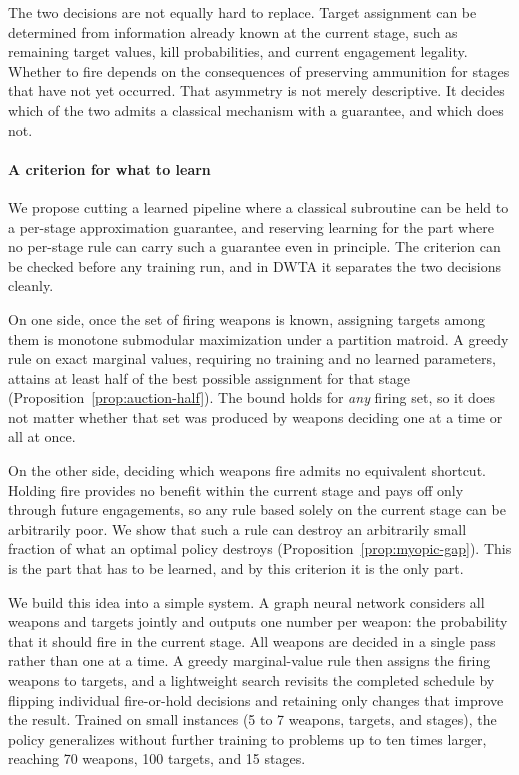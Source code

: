 The two decisions are not equally hard to replace. Target assignment can be
determined from information already known at the current stage, such as
remaining target values, kill probabilities, and current engagement legality.
Whether to fire depends on the consequences of preserving ammunition for
stages that have not yet occurred. That asymmetry is not merely descriptive.
It decides which of the two admits a classical mechanism with a guarantee,
and which does not.

\paragraph{A criterion for what to learn} We propose cutting a learned
pipeline where a classical subroutine can be held to a per-stage approximation
guarantee, and reserving learning for the part where no per-stage rule can
carry such a guarantee even in principle. The criterion can be checked before
any training run, and in DWTA it separates the two decisions cleanly.

On one side, once the set of firing weapons is known, assigning targets among
them is monotone submodular maximization under a partition matroid. A greedy
rule on exact marginal values, requiring no training and no learned
parameters, attains at least half of the best possible assignment for that
stage (Proposition~\ref{prop:auction-half}). The bound holds for \emph{any}
firing set, so it does not matter whether that set was produced by weapons
deciding one at a time or all at once.

On the other side, deciding which weapons fire admits no equivalent shortcut.
Holding fire provides no benefit within the current stage and pays off only
through future engagements, so any rule based solely on the current stage can
be arbitrarily poor. We show that such a rule can destroy an arbitrarily small
fraction of what an optimal policy destroys
(Proposition~\ref{prop:myopic-gap}). This is the part that has to be learned,
and by this criterion it is the only part.

We build this idea into a simple system. A graph neural network considers all
weapons and targets jointly and outputs one number per weapon: the
probability that it should fire in the current stage. All weapons are
decided in a single pass rather than one at a time. A greedy marginal-value
rule then assigns the firing weapons to targets, and a lightweight search
revisits the completed schedule by flipping individual fire-or-hold decisions
and retaining only changes that improve the result. Trained on small instances
(5 to 7 weapons, targets, and stages), the policy generalizes without
further training to problems up to ten times larger, reaching 70 weapons,
100 targets, and 15 stages.

